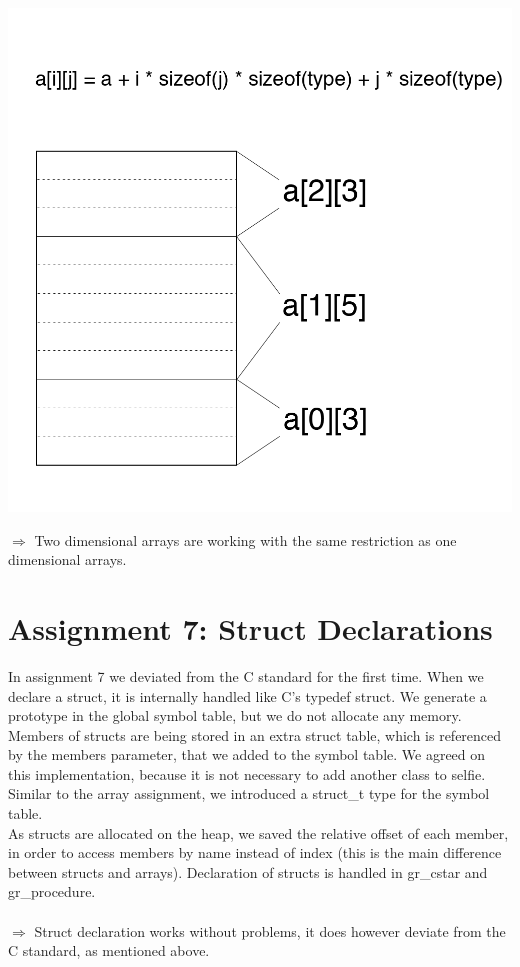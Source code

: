 \documentclass[a4paper,12pt]{article}
\begin{document}
\includegraphics[scale=0.4]{array.png} 

$\Rightarrow$ Two dimensional arrays are working with the same restriction as one dimensional arrays.

\section{Assignment 7: Struct Declarations}
In assignment 7 we deviated from the C standard\cite{cs50} for the first time. When we declare a struct, it is internally handled like C's typedef struct. We generate a prototype in the global symbol table, but we do not allocate any memory. 
Members of structs are being stored in an extra struct table, which is referenced by the members parameter, that we added to the symbol table. We agreed on this implementation, because it is not necessary to add another class to selfie. Similar to the array assignment, we introduced a struct\_t type for the symbol table.\\As structs are allocated on the heap, we saved the relative offset of each member, in order to access members by name instead of index (this is the main difference between structs and arrays). Declaration of structs is handled in gr\_cstar and gr\_procedure.
\\\\
$\Rightarrow$ Struct declaration works without problems, it does however deviate from the C standard\cite{cs50}, as mentioned above. 
\end{document}

